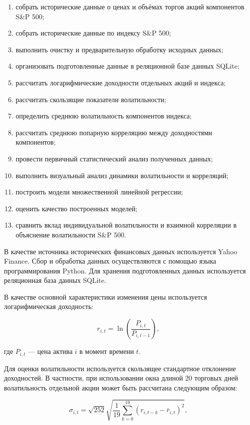 \documentclass[12pt]{article}
\begin{document}
\begin{enumerate}
    \item собрать исторические данные о ценах и объёмах торгов акций компонентов S\&P 500;
    \item собрать исторические данные по индексу S\&P 500;
    \item выполнить очистку и предварительную обработку исходных данных;
    \item организовать подготовленные данные в реляционной базе данных SQLite;
    \item рассчитать логарифмические доходности отдельных акций и индекса;
    \item рассчитать скользящие показатели волатильности;
    \item определить среднюю волатильность компонентов индекса;
    \item рассчитать среднюю попарную корреляцию между доходностями компонентов;
    \item провести первичный статистический анализ полученных данных;
    \item выполнить визуальный анализ динамики волатильности и корреляций;
    \item построить модели множественной линейной регрессии;
    \item оценить качество построенных моделей;
    \item сравнить вклад индивидуальной волатильности и взаимной корреляции в объяснение волатильности S\&P 500.
\end{enumerate}

В качестве источника исторических финансовых данных используется Yahoo Finance. Сбор и обработка данных осуществляются с помощью языка программирования Python. Для хранения подготовленных данных используется реляционная база данных SQLite.

В качестве основной характеристики изменения цены используется логарифмическая доходность:

\begin{equation}
r_{i,t} =
\ln\left(\frac{P_{i,t}}{P_{i,t-1}}\right),
\end{equation}

где $P_{i,t}$ --- цена актива $i$ в момент времени $t$.

Для оценки волатильности используется скользящее стандартное отклонение доходностей. В частности, при использовании окна длиной 20 торговых дней волатильность отдельной акции может быть рассчитана следующим образом:

\begin{equation}
\sigma_{i,t}
=
\sqrt{252}
\sqrt{
\frac{1}{19}
\sum_{k=0}^{19}
\left(r_{i,t-k}-\bar r_{i,t}\right)^2
},
\end{equation}
\end{document}
